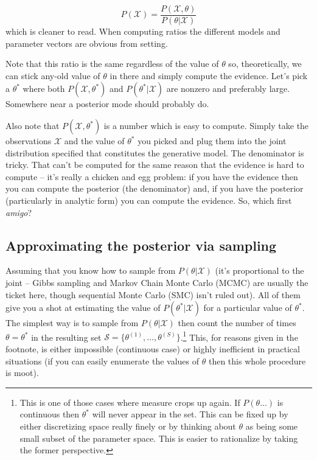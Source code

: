 \documentclass[11pt]{amsart}
\begin{document}
\begin{equation}
P(\mathcal{X}) = \frac{P(\mathcal{X}, \theta)}{P(\theta|\mathcal{X})}
\label{eqn:evidence}
\end{equation}
%
which is cleaner to read.  When computing ratios the different models and parameter vectors are obvious from setting.  

Note that this ratio is the same regardless of the value of $\theta$ so, theoretically, we can stick any-old value of $\theta$ in there and simply compute the evidence.   Let's pick a $\theta^*$ where both $P(\mathcal{X}, \theta^*)$ and $P(\theta^*|\mathcal{X})$ are nonzero and preferably large.  Somewhere near a posterior mode should probably do.

Also note that $P(\mathcal{X}, \theta^*)$ is a number which is easy to compute.  Simply take the observations $\mathcal{X}$ and the value of $\theta^*$ you picked and plug them into the joint distribution specified that constitutes the generative model.  The denominator is tricky.  That can't be computed for the same reason that the evidence is hard to compute -- it's really a chicken and egg problem: if you have the evidence then you can compute the posterior (the denominator) and, if you have the posterior (particularly in analytic form) you can compute the evidence.  So, which first {\em amigo}?

\subsection{Approximating the posterior via sampling}

Assuming that you know how to sample from $P(\theta|\mathcal{X})$ (it's proportional to the joint -- Gibbs sampling and Markov Chain Monte Carlo (MCMC) are usually the ticket here, though sequential Monte Carlo (SMC) isn't ruled out).  All of them give you a shot at estimating the value of $P(\theta^*|\mathcal{X})$ for a particular value of $\theta^*$.  The simplest way is to sample from $P(\theta|\mathcal{X})$ then count the number of times $\theta = \theta^*$ in the resulting set $\mathcal{S} = \{ \theta^{(1)}, \ldots, \theta^{(S)}\}$.\footnote{This is one of those cases where measure crops up again.  If $P(\theta...)$ is continuous then $\theta^*$ will never appear in the set.  This can be fixed up by either discretizing space really finely or by thinking about $\theta$ as being some small subset of the parameter space.  This is easier to rationalize by taking the former perspective.}  This, for reasons given in the footnote, is either impossible (continuous case) or highly inefficient in practical situations (if you can easily enumerate the values of $\theta$ then this whole procedure is moot).
\end{document}
